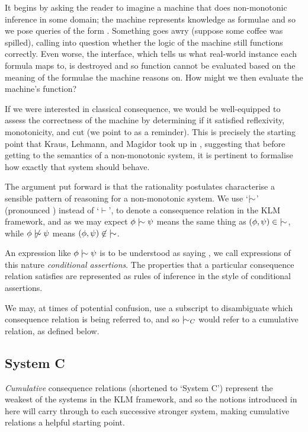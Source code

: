 It begins by asking the reader to imagine a machine that does non-monotonic inference in some domain; the machine represents knowledge as
formulae and so we pose queries of the form . Something goes awry (suppose some coffee
was spilled), calling into question whether the logic of the machine still functions correctly. Even worse, the interface, which tells us
what real-world instance each formula maps to, is destroyed and so function cannot be evaluated based on the meaning of the formulae the machine
reasons on. How might we then evaluate the machine's function?

If we were interested in classical consequence, we would be well-equipped to assess the correctness of the machine by determining if it satisfied
reflexivity, monotonicity, and cut (we point to  as a reminder). This is precisely the starting point
that Kraus, Lehmann, and Magidor took up in \cite{kraus1990nonmonotonic}, suggesting that before getting to the semantics of a non-monotonic
system, it is pertinent to formalise how exactly that system should behave.

The argument put forward is that the rationality postulates characterise a sensible pattern of reasoning for a non-monotonic system. We use `$\twiddle$'
(pronounced ) instead of `$\vdash$', to denote a consequence relation in the KLM framework, and as we may expect
$\phi \twiddle \psi$ means the same thing as $(\phi, \psi) \in \; \twiddle$, while $\phi \ntwiddle \psi$ means $(\phi, \psi ) \not \in \; \twiddle$.

An expression like $\phi \twiddle \psi$ is to be understood as saying , we call expressions
of this nature \textit{conditional assertions}. The properties that a particular consequence relation satisfies are represented as rules of inference
in the style of conditional assertions.

We may, at times of potential confusion, use a subscript to disambiguate which consequence relation is being referred to, and so
$\twiddle_{C}$ would refer to a cumulative relation, as defined below.

\subsection{System C}
\label{subsection:system-c} \textit{Cumulative} consequence relations (shortened to `System C') \cite{kraus1990nonmonotonic} represent the
weakest of the systems in the KLM framework, and so the notions introduced in here will carry through to each successive stronger system,
making cumulative relations a helpful starting point.

